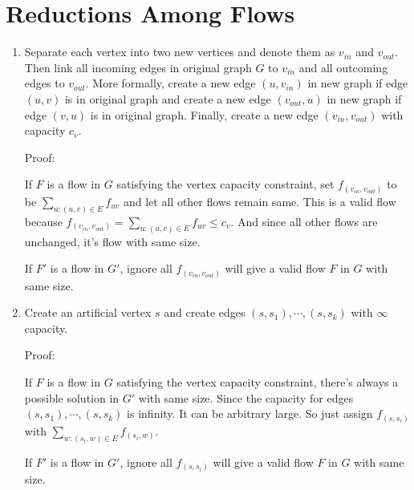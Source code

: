 \documentclass[11pt]{article}
\newenvironment{qparts}{\begin{enumerate}[{(}a{)}]}{\end{enumerate}}
\begin{document}
\section{Reductions Among Flows}
\begin{qparts}
	
	\item 

	Separate each vertex into two new vertices and denote them as $v_{in}$ and $v_{out}$. Then link all incoming edges in original graph $G$ to $v_{in}$ and all outcoming edges to $v_{out}$. More formally, create a new edge $(u, v_{in})$ in new graph if edge $(u, v)$ is in original graph and create a new edge $(v_{out}, u)$ in new graph if edge $(v, u)$ is in original graph. Finally, create a new edge $(v_{in}, v_{out})$ with capacity $c_v$.
	
	Proof:
	
	If $F$ is a flow in $G$ satisfying the vertex capacity constraint, set $f_{(v_{in}, v_{out})}$ to be $\sum_{u:(u, v)\in E} f_{uv}$ and let all other flows remain same. This is a valid flow because $f_{(v_{in}, v_{out})} = \sum_{u:(u, v)\in E} f_{uv} \le c_v$. And since all other flows are unchanged, it's flow with same size.
	
	If $F\prime$ is a flow in $G\prime$, ignore all $f_{(v_{in}, v_{out})}$ will give a valid flow $F$ in $G$ with same size.

	\item 

	Create an artificial vertex $s$ and create edges $(s, s_1), \cdots, (s, s_k)$ with $\infty$ capacity.
	
	Proof:
	
	If $F$ is a flow in $G$ satisfying the vertex capacity constraint, there's always a possible solution in $G\prime$ with same size. Since the capacity for edges $(s, s_1), \cdots, (s, s_k)$ is infinity. It can be arbitrary large. So just assign $f_{(s, s_i)}$ with $\sum_{w:(s_i, w) \in E}f_{(s_i, w)}$.
	
	If $F\prime$ is a flow in $G\prime$, ignore all $f_{(s, s_i)}$ will give a valid flow $F$ in $G$ with same size.	
		
\end{qparts}
\newpage
\end{document}
